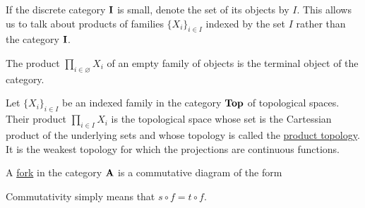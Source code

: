 \begin{note}\label{note:small_categorical_product}
  If the discrete category $\operatorname{\mathbf{I}}$ is small, denote the set of its objects by $I$. This allows us to talk about products of families $\{ X_i \}_{i \in I}$ indexed by the set $I$ rather than the category $\operatorname{\mathbf{I}}$.
\end{note}

\begin{note}\label{note:categorical_product_of_empty_family}
  The product $\prod_{i \in \varnothing} X_i$ of an empty family of objects is the terminal object of the category.
\end{note}

\begin{example}\label{ex:categorical_product/top}
  Let $\{ X_i \}_{i \in I}$ be an indexed family in the category $\operatorname{\mathbf{Top}}$ of topological spaces. Their product $\prod_{i \in I} X_i$ is the topological space whose set is the Cartessian product of the underlying sets and whose topology is called the \uline{product topology}. It is the weakest topology for which the projections are continuous functions.
\end{example}

\begin{definition}\label{def:categorical_fork}\cite[112]{Leinster2014}
  A \uline{fork} in the category $\operatorname{\mathbf{A}}$ is a commutative diagram of the form
  \begin{center}
  \end{center}

  Commutativity simply means that $s \circ f = t \circ f$.
\end{definition}

